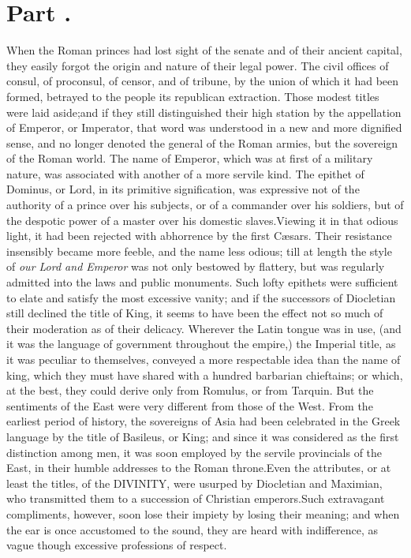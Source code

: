 \section{Part \thesection.}
\thispagestyle{simple}

When the Roman princes had lost sight of the senate and of their
ancient capital, they easily forgot the origin and nature of
their legal power. The civil offices of consul, of proconsul, of
censor, and of tribune, by the union of which it had been formed,
betrayed to the people its republican extraction. Those modest
titles were laid aside;\footnotemark[97] and if they still distinguished their
high station by the appellation of Emperor, or Imperator, that
word was understood in a new and more dignified sense, and no
longer denoted the general of the Roman armies, but the sovereign
of the Roman world. The name of Emperor, which was at first of a
military nature, was associated with another of a more servile
kind. The epithet of Dominus, or Lord, in its primitive
signification, was expressive not of the authority of a prince
over his subjects, or of a commander over his soldiers, but of
the despotic power of a master over his domestic slaves.\footnotemark[98]
Viewing it in that odious light, it had been rejected with
abhorrence by the first Cæsars. Their resistance insensibly
became more feeble, and the name less odious; till at length the
style of \textit{our Lord and Emperor} was not only bestowed by
flattery, but was regularly admitted into the laws and public
monuments. Such lofty epithets were sufficient to elate and
satisfy the most excessive vanity; and if the successors of
Diocletian still declined the title of King, it seems to have
been the effect not so much of their moderation as of their
delicacy. Wherever the Latin tongue was in use, (and it was the
language of government throughout the empire,) the Imperial
title, as it was peculiar to themselves, conveyed a more
respectable idea than the name of king, which they must have
shared with a hundred barbarian chieftains; or which, at the
best, they could derive only from Romulus, or from Tarquin. But
the sentiments of the East were very different from those of the
West. From the earliest period of history, the sovereigns of Asia
had been celebrated in the Greek language by the title of
Basileus, or King; and since it was considered as the first
distinction among men, it was soon employed by the servile
provincials of the East, in their humble addresses to the Roman
throne.\footnotemark[99] Even the attributes, or at least the titles, of the
DIVINITY, were usurped by Diocletian and Maximian, who
transmitted them to a succession of Christian emperors.\footnotemark[100] Such
extravagant compliments, however, soon lose their impiety by
losing their meaning; and when the ear is once accustomed to the
sound, they are heard with indifference, as vague though
excessive professions of respect.

